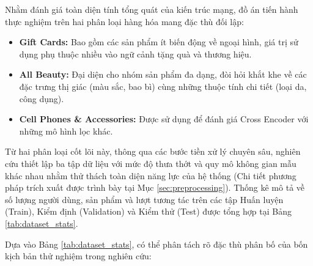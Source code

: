 Nhằm đánh giá toàn diện tính tổng quát của kiến trúc mạng, đồ án tiến hành thực nghiệm trên hai phân loại hàng hóa mang đặc thù đối lập:
\begin{itemize}
    \item \textbf{Gift Cards:} Bao gồm các sản phẩm ít biến động về ngoại hình, giá trị sử dụng phụ thuộc nhiều vào ngữ cảnh tặng quà và thương hiệu. 
    \item \textbf{All Beauty:} Đại diện cho nhóm sản phẩm đa dạng, đòi hỏi khắt khe về các đặc trưng thị giác (màu sắc, bao bì) cùng những thuộc tính chi tiết (loại da, công dụng).
    \item \textbf{Cell Phones \& Accessories:} Được sử dụng để đánh giá Cross Encoder với những mô hình lọc khác.
\end{itemize}

Từ hai phân loại cốt lõi này, thông qua các bước tiền xử lý chuyên sâu, nghiên cứu thiết lập ba tập dữ liệu với mức độ thưa thớt và quy mô không gian mẫu khác nhau nhằm thử thách toàn diện năng lực của hệ thống (Chi tiết phương pháp trích xuất được trình bày tại Mục \ref{sec:preprocessing}). Thống kê mô tả về số lượng người dùng, sản phẩm và lượt tương tác trên các tập Huấn luyện (Train), Kiểm định (Validation) và Kiểm thử (Test) được tổng hợp tại Bảng \ref{tab:dataset_stats}.

\begin{table}[H]
\centering
\caption{Thống kê mô tả số lượng người dùng, tương tác và sản phẩm trên các tập dữ liệu}
\label{tab:dataset_stats}
\renewcommand{\arraystretch}{1.2}
\end{table}

Dựa vào Bảng \ref{tab:dataset_stats}, có thể phân tách rõ đặc thù phân bố của bốn kịch bản thử nghiệm trong nghiên cứu:

